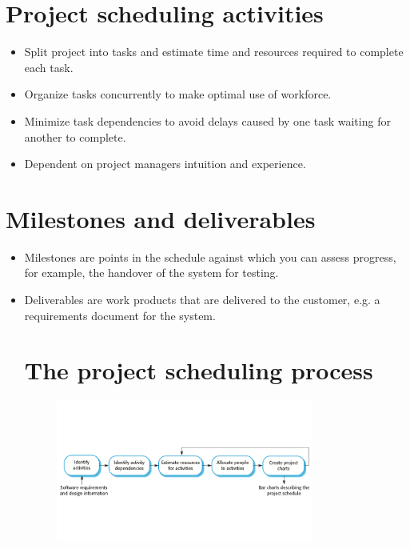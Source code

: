 \section{Project scheduling activities}
\begin{itemize}

\item Split project into tasks and estimate time and resources required to complete each task.

\item Organize tasks concurrently to make optimal use of workforce.

\item Minimize task dependencies to avoid delays caused by one task waiting for another to complete.

\item Dependent on project managers intuition and experience.
\end{itemize}
\section{Milestones and deliverables}
\begin{itemize}

\item Milestones are points in the schedule against which you can assess progress, for example, the handover of the system for testing.

\item Deliverables are work products that are delivered to the customer, e.g. a requirements document for the system.
\section{The project scheduling process}
\begin{figure}[h!]
    \centering
    \includegraphics[width = 0.8\textwidth]{./figures/L6_2.png}
    \caption{}
    \label{fig:L6_2}
\end{figure}


\end{itemize}

